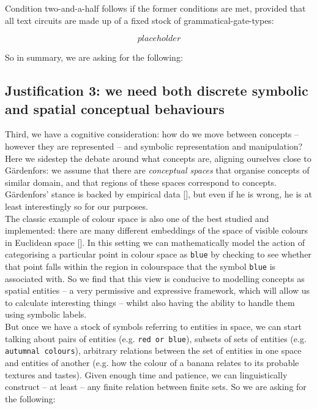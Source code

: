 \begin{fullwidth}
Condition two-and-a-half follows if the former conditions are met, provided that all text circuits are made up of a fixed stock of grammatical-gate-types:

\[placeholder\]

So in summary, we are asking for the following:

\begin{requirement}

\end{requirement}

\subsection{Justification 3: we need both discrete symbolic and spatial conceptual behaviours}\label{just:rel}

Third, we have a cognitive consideration: how do we move between concepts -- however they are represented -- and symbolic representation and manipulation? Here we sidestep the debate around what concepts are, aligning ourselves close to G\"{a}rdenfors: we assume that there are \emph{conceptual spaces} that organise concepts of similar domain, and that regions of these spaces correspond to concepts. G\"{a}rdenfors' stance is backed by empirical data [], but even if he is wrong, he is at least interestingly so for our purposes.\\

The classic example of colour space is also one of the best studied and implemented: there are many different embeddings of the space of visible colours in Euclidean space []. In this setting we can mathematically model the action of categorising a particular point in colour space as \texttt{blue} by checking to see whether that point falls within the region in colourspace that the symbol \texttt{blue} is associated with. So we find that this view is conducive to modelling concepts as spatial entities -- a very permissive and expressive framework, which will allow us to calculate interesting things -- whilst also having the ability to handle them using symbolic labels.\\

But once we have a stock of symbols referring to entities in space, we can start talking about pairs of entities (e.g. \texttt{red or blue}), subsets of sets of entities (e.g. \texttt{autumnal colours}), arbitrary relations between the set of entities in one space and entities of another (e.g. how the colour of a banana relates to its probable textures and tastes). Given enough time and patience, we can linguistically construct -- at least -- any finite relation between finite sets. So we are asking for the following:


\end{fullwidth}
